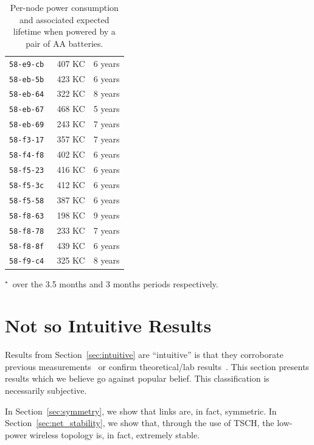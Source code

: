 \documentclass{elsarticle}
\newcommand{\building}            {Smart Building\xspace}
\begin{document}
\begin{table}
\begin{subtable}{.43\textwidth}
\begin{tabular}{|c|c|c|}
        \tt{58-e9-cb} &          407 KC &  6 years \\
        \tt{58-eb-5b} &          423 KC &  6 years \\
        \tt{58-eb-64} &          322 KC &  8 years \\
        \tt{58-eb-67} &          468 KC &  5 years \\
        \tt{58-eb-69} &          243 KC &  7 years \\
        \tt{58-f3-17} &          357 KC &  7 years \\
        \tt{58-f4-f8} &          402 KC &  6 years \\
        \tt{58-f5-23} &          416 KC &  6 years \\
        \tt{58-f5-3c} &          412 KC &  6 years \\
        \tt{58-f5-58} &          387 KC &  6 years \\
        \tt{58-f8-63} &          198 KC &  9 years \\
        \tt{58-f8-78} &          233 KC &  7 years \\
        \tt{58-f8-8f} &          439 KC &  6 years \\
        \tt{58-f9-c4} &          325 KC &  8 years \\
        \bottomrule
    \end{tabular}
    \caption{\building}
\end{subtable}\hfill
\vspace{2mm}
$^\star$~over the 3.5 months and 3 months periods respectively.
\caption{Per-node power consumption and associated expected lifetime when powered by a pair of AA batteries.}
\label{tab:stats_charge}
\end{table}

\section{Not so Intuitive Results}
\label{sec:notsointuitive}

Results from Section~\ref{sec:intuitive} are ``intuitive'' is that they corroborate previous measurements~\cite{watteyne16peach} or confirm theoretical/lab results~\cite{watteyne10mitigating,watteyne09reliability,watteyne15industrial}.
This section presents results which we believe go against popular belief.
This classification is necessarily subjective.

In Section~\ref{sec:symmetry}, we show that links are, in fact, symmetric.
In Section~\ref{sec:net_stability}, we show that, through the use of TSCH, the low-power wireless topology is, in fact, extremely stable.
\end{document}
